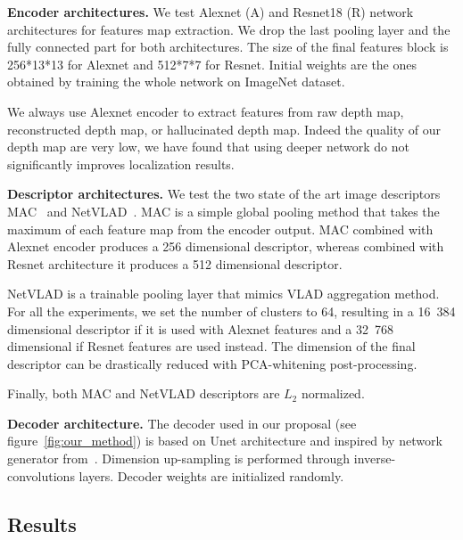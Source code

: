 \vspace{4pt}\noindent\textbf{Encoder architectures.} We test Alexnet (A) and Resnet18 (R) network architectures for features map extraction. We drop the last pooling layer and the fully connected part for both architectures. The size of the final features block is 256*13*13 for Alexnet and 512*7*7 for Resnet. Initial weights are the ones obtained by training the whole network on ImageNet dataset.

We always use Alexnet encoder to extract features from raw depth map, reconstructed depth map, or hallucinated depth map. Indeed the quality of our depth map are very low, we have found that using deeper network do not significantly improves localization results.

\vspace{4pt}\noindent\textbf{Descriptor architectures.} We test the two state of the art image descriptors MAC~\cite{Radenovic2017} and NetVLAD~\cite{Arandjelovic2017}. MAC is a simple global pooling method that takes the maximum of each feature map from the encoder output. MAC combined with Alexnet encoder produces a 256 dimensional descriptor, whereas combined with Resnet architecture it produces a 512 dimensional descriptor.

NetVLAD is a trainable pooling layer that mimics VLAD aggregation method. For all the experiments, we set the number of clusters to 64, resulting in a 16~384 dimensional descriptor if it is used with Alexnet features and a 32~768 dimensional if Resnet features are used instead. The dimension of the final descriptor can be drastically reduced with PCA-whitening post-processing.

Finally, both MAC and NetVLAD descriptors are $L_{2}$ normalized.

\vspace{4pt}\noindent\textbf{Decoder architecture.} The decoder used in our proposal (see figure~\ref{fig:our_method}) is based on Unet architecture and inspired by network generator from~\cite{Isola2018}. Dimension up-sampling is performed through inverse-convolutions layers. Decoder weights are initialized randomly.

\subsection{Results}
\label{subsec:results}

